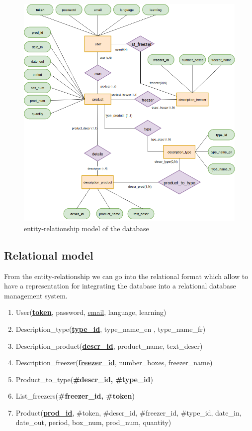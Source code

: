 \begin{figure}[H]
\centering
\includegraphics[scale=0.5]{./images/reldb.png}
\caption{entity-relationship model of the database}
\label{fig:reldb}
\end{figure}

\subsection{Relational model}
From the entity-relationship we can go into the relational format which allow to have a representation for integrating the database into a relational database management system.
\begin{enumerate}
\item User(\underline{\textbf{token}}, password, \underline{email}, language, learning)
\item Description\_type(\underline{\textbf{type\_id}}, type\_name\_en , type\_name\_fr)
\item Description\_product(\underline{\textbf{descr\_id}}, product\_name, text\_descr)
\item Description\_freezer(\underline{\textbf{freezer\_id}}, number\_boxes, freezer\_name)
\item Product\_to\_type(\textbf{\#descr\_id, \#type\_id})
\item List\_freezers(\textbf{\#freezer\_id, \#token})
\item Product(\underline{\textbf{prod\_id}}, \#token, \#descr\_id, \#freezer\_id, \#type\_id, date\_in, date\_out, period, box\_num, prod\_num, quantity)
\end{enumerate}

